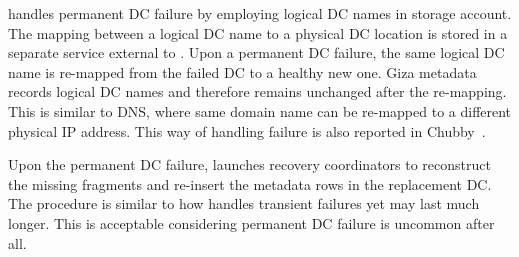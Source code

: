 %

\name handles permanent DC failure by employing logical DC names in storage account. The mapping between a logical DC name to a physical DC location is stored in a separate service external to \name. Upon a permanent DC failure, the same logical DC name is re-mapped from the failed DC to a healthy new one. Giza metadata records logical DC names and therefore remains unchanged after the re-mapping. This is similar to DNS, where same domain name can be re-mapped to a different physical IP address. This way of handling failure is also reported in Chubby~\cite{chubby:osdi06}.

Upon the permanent DC failure, \name launches recovery coordinators to reconstruct the missing fragments and re-insert the metadata rows in the replacement DC. The procedure is similar to how \name handles transient failures yet may last much longer. This is acceptable considering permanent DC failure is uncommon after all.



